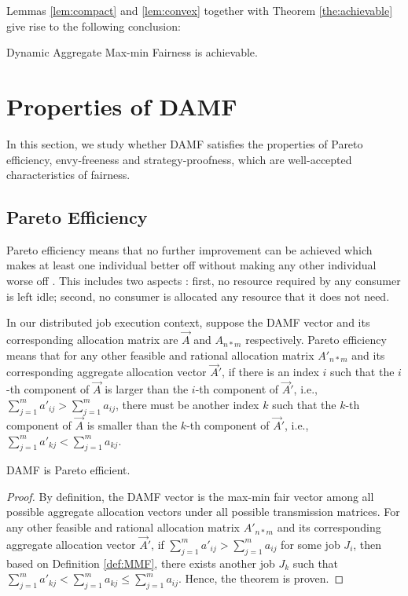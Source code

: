 Lemmas \ref{lem:compact} and \ref{lem:convex} together with Theorem \ref{the:achievable} give rise to the following conclusion:
\begin{theorem}
    Dynamic Aggregate Max-min Fairness is achievable.
\label{the:DAMFachievable}
\end{theorem}

\section{Properties of DAMF}
\label{sec:property}
In this section, we study whether DAMF satisfies the properties of Pareto efficiency, envy-freeness and strategy-proofness, which are well-accepted characteristics of fairness. %
\subsection{Pareto Efficiency}
Pareto efficiency means that no further improvement can be achieved which makes at least one individual better off without making any other individual worse off \cite{DRF}. This includes two aspects \cite{gutman2012GDF}: first, no resource required by any consumer is left idle; second, no consumer is allocated any resource that it does not need.

In our distributed job execution context, suppose the DAMF vector and its corresponding allocation matrix are $\vec A$ and $A_{n*m}$ respectively. Pareto efficiency means that for any other feasible and rational allocation matrix $A'_{n*m}$ and its corresponding aggregate allocation vector $\vec A'$, if there is an index $i$ such that the $i$-th component of $\vec A$ is larger than the $i$-th component of $\vec A'$, i.e., $\sum_{j=1}^m a'_{ij} > \sum_{j=1}^m a_{ij}$, there must be another index $k$ such that the $k$-th component of $\vec A$ is smaller than the $k$-th component of $\vec A'$, i.e., $\sum_{j=1}^m a'_{kj} < \sum_{j=1}^m a_{kj}$.

\begin{theorem}
    DAMF is Pareto efficient.
\end{theorem}
\begin{proof}
    By definition, the DAMF vector is the max-min fair vector among all possible aggregate allocation vectors under all possible transmission matrices. For any other feasible and rational allocation matrix $A'_{n*m}$ and its corresponding aggregate allocation vector $\vec A'$, if $\sum_{j=1}^m a'_{ij} > \sum_{j=1}^m a_{ij}$ for some job $J_i$, then based on Definition \ref{def:MMF}, there exists another job $J_k$ such that $\sum_{j=1}^m a'_{kj} < \sum_{j=1}^m a_{kj} \leq \sum_{j=1}^m a_{ij}$. Hence, the theorem is proven. 
\end{proof}

